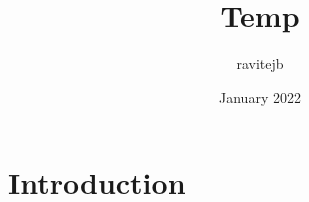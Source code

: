 \documentclass{article}
\title{Temp}
\author{ravitejb }
\date{January 2022}
\begin{document}
\maketitle

\section{Introduction}
\end{document}
